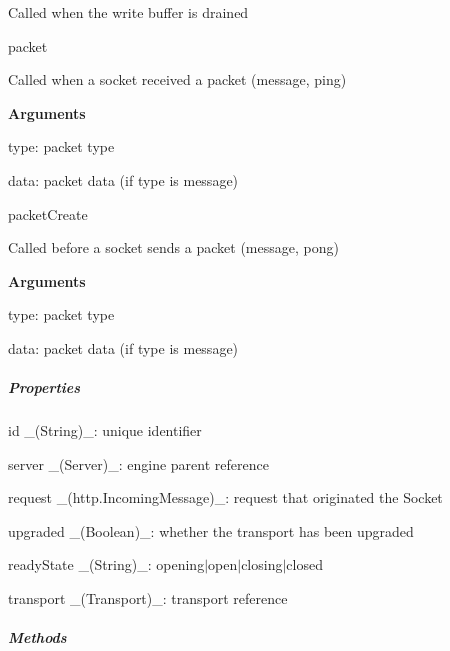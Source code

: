\begin{DoxyItemize}
\begin{DoxyItemize}
\item Called when the write buffer is drained
\end{DoxyItemize}
\item {\ttfamily packet}
\begin{DoxyItemize}
\item Called when a socket received a packet ({\ttfamily message}, {\ttfamily ping})
\item {\bfseries Arguments}
\begin{DoxyItemize}
\item {\ttfamily type}\+: packet type
\item {\ttfamily data}\+: packet data (if type is message)
\end{DoxyItemize}
\end{DoxyItemize}
\item {\ttfamily packet\+Create}
\begin{DoxyItemize}
\item Called before a socket sends a packet ({\ttfamily message}, {\ttfamily pong})
\item {\bfseries Arguments}
\begin{DoxyItemize}
\item {\ttfamily type}\+: packet type
\item {\ttfamily data}\+: packet data (if type is message)
\end{DoxyItemize}
\end{DoxyItemize}
\end{DoxyItemize}

\subparagraph*{Properties}


\begin{DoxyItemize}
\item {\ttfamily id} \+\_\+(\+String)\+\_\+\+: unique identifier
\item {\ttfamily server} \+\_\+(\+Server)\+\_\+\+: engine parent reference
\item {\ttfamily request} \+\_\+(http.\+Incoming\+Message)\+\_\+\+: request that originated the Socket
\item {\ttfamily upgraded} \+\_\+(\+Boolean)\+\_\+\+: whether the transport has been upgraded
\item {\ttfamily ready\+State} \+\_\+(\+String)\+\_\+\+: opening$\vert$open$\vert$closing$\vert$closed
\item {\ttfamily transport} \+\_\+(\+Transport)\+\_\+\+: transport reference
\end{DoxyItemize}

\subparagraph*{Methods}


